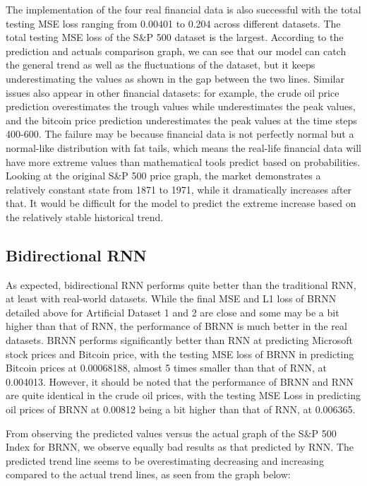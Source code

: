 \documentclass[letterpaper, 10 pt, conference]{ieeeconf}  %
\begin{document}
        The implementation of the four real financial data is also successful with the total testing MSE loss ranging from 0.00401 to 0.204 across different datasets. The total testing MSE loss of the S\&P 500 dataset is the largest. According to the prediction and actuals comparison graph, we can see that our model can catch the general trend as well as the fluctuations of the dataset, but it keeps underestimating the values as shown in the gap between the two lines. Similar issues also appear in other financial datasets: for example, the crude oil price prediction overestimates the trough values while underestimates the peak values, and the bitcoin price prediction underestimates the peak values at the time steps 400-600. The failure may be because financial data is not perfectly normal but a normal-like distribution with fat tails, which means the real-life financial data will have more extreme values than mathematical tools predict based on probabilities. Looking at the original S\&P 500 price graph, the market demonstrates a relatively constant state from 1871 to 1971, while it dramatically increases after that. It would be difficult for the model to predict the extreme increase based on the relatively stable historical trend. 


    \subsection{Bidirectional RNN}

        As expected, bidirectional RNN performs quite better than the traditional RNN, at least with real-world datasets. While the final MSE and L1 loss of BRNN detailed above for Artificial Dataset 1 and 2 are close and some may be a bit higher than that of RNN, the performance of BRNN is much better in the real datasets. BRNN performs significantly better than RNN at predicting Microsoft stock prices and Bitcoin price, with the testing MSE loss of BRNN in predicting Bitcoin prices at 0.00068188, almost 5 times smaller than that of RNN, at 0.004013. However, it should be noted that the performance of BRNN and RNN are quite identical in the crude oil prices, with the testing MSE Loss in predicting oil prices of BRNN at 0.00812 being a bit higher than that of RNN, at 0.006365.

        From observing the predicted values versus the actual graph of the S\&P 500 Index for BRNN, we observe equally bad results as that predicted by RNN. The predicted trend line seems to be overestimating decreasing and increasing compared to the actual trend lines, as seen from the graph below:
\end{document}
